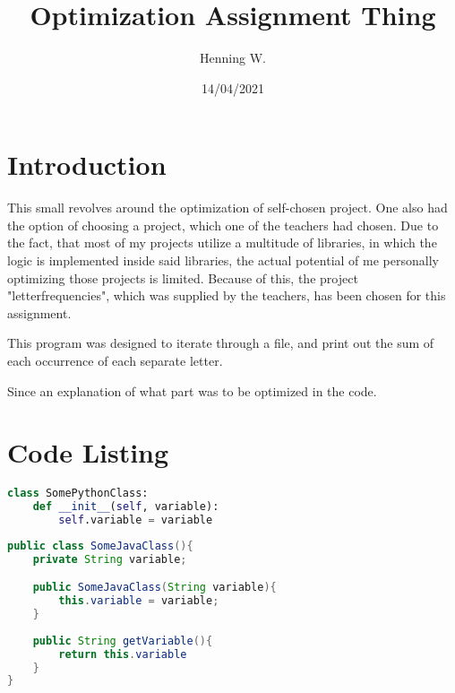\documentclass[a4paper, 12pt]{report}
\begin{document}
\title{\Large{\textbf{Optimization Assignment Thing}}}
\author{Henning W.}
\date{14/04/2021}
\maketitle
\tableofcontents
\setcounter{page}{2}
\fancyhf{}
\renewcommand{\headrulewidth}{2pt}
\renewcommand{\headrulewidth}{2pt}
\pagestyle{fancy} %
\fancyhf{} %
\fancyfoot[R]{\thepage}

\fancypagestyle{plain}{%
    \renewcommand{\headrulewidth}{0pt}%
    \fancyhf{}%
    \fancyfoot[R]{\thepage}%
}

\chapter{Introduction}
This small revolves around the optimization of self-chosen project. One also had the option of choosing a project, which one of the teachers had chosen. Due to the fact, that most of my projects utilize a multitude of libraries, in which the logic is implemented inside said libraries, the actual potential of me personally optimizing those projects is limited. Because of this, the project "letterfrequencies", which was supplied by the teachers, has been chosen for this assignment.

This program was designed to iterate through a file, and print out the sum of each occurrence of each separate letter. 

Since an explanation of what part was to be optimized in the code.

\chapter{Code Listing}

\begin{lstlisting}[language=Python]
class SomePythonClass:
	def __init__(self, variable):
		self.variable = variable
\end{lstlisting}

\begin{lstlisting}[language=java]
public class SomeJavaClass(){
	private String variable;

	public SomeJavaClass(String variable){
		this.variable = variable;
	}
	
	public String getVariable(){
		return this.variable
	}	
}
\end{lstlisting}
\end{document}
